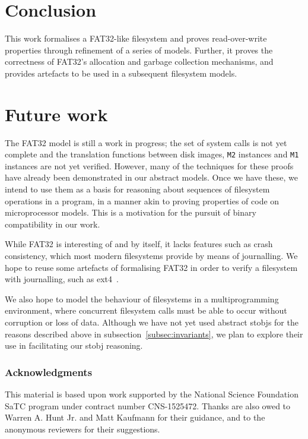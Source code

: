 \documentclass[submission,copyright,creativecommons]{eptcs}
\begin{document}


\section{Conclusion}

This work formalises a FAT32-like filesystem and proves
read-over-write properties through refinement of a series of
models. Further, it proves the correctness of FAT32's allocation and
garbage collection mechanisms, and provides artefacts to be used in a
subsequent filesystem models.

\section{Future work}

The FAT32 model is still a work in progress; the set of system calls
is not yet complete and the translation functions between disk images,
\texttt{M2} instances and \texttt{M1} instances are not yet
verified. However, many of the techniques for these proofs have
already been demonstrated in our abstract models. Once we have these,
we intend to use them as a basis for
reasoning about sequences of filesystem operations in a program, in a
manner akin to proving properties of code on microprocessor
models. This is a motivation for the pursuit of binary compatibility
in our work.

While FAT32 is interesting of and by itself, it lacks features such as
crash consistency, which most modern filesystems provide by means of
journalling. We hope to reuse some artefacts of formalising FAT32 in
order to verify a filesystem with journalling, such as
ext4~\cite{mathur2007new}.

We also hope to model the behaviour of filesystems in a
multiprogramming environment, where concurrent filesystem calls must
be able to occur without corruption or loss of data. Although we have
not yet used abstract stobjs for the reasons described
above in subsection~\ref{subsec:invariants}, we plan to explore their
use in facilitating our stobj reasoning.

\subsubsection*{Acknowledgments} This material is based upon work
supported by the National Science Foundation SaTC program under
contract number CNS-1525472. Thanks are also owed to Warren A. Hunt
Jr. and Matt Kaufmann for their guidance, and to the anonymous
reviewers for their suggestions.



\end{document}
